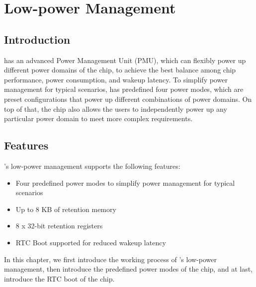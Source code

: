 \documentclass[main\_\_EN.tex]{subfiles}
\begin{document}

\ifglobal
\else
    {\let\clearpage\relax \listoftodos}
    \tableofcontents
\fi



\hypertarget{lowpowm}{}
\chapter{Low-power Management}\label{mod:lowpowm}

\section{Introduction}

\chipname{} has an advanced Power Management Unit (PMU), which can flexibly power up different power domains of the chip, to achieve the best balance among chip performance, power consumption, and wakeup latency. To simplify power management for typical scenarios, \chipname{} has predefined four power modes, which are preset configurations that power up different combinations of power domains. On top of that, the chip also allows the users to independently power up any particular power domain to meet more complex requirements.

\section{Features}
\chipname{}'s low-power management supports the following features:
\begin{itemize}
    \item Four predefined power modes to simplify power management for typical scenarios
    \item Up to 8 KB of retention memory
    \item 8 x 32-bit retention registers
    \item RTC Boot supported for reduced wakeup latency
\end{itemize}

In this chapter, we first introduce the working process of \chipname{}'s low-power management, then introduce the predefined power modes of the chip, and at last, introduce the RTC boot of the chip.
\end{document}
